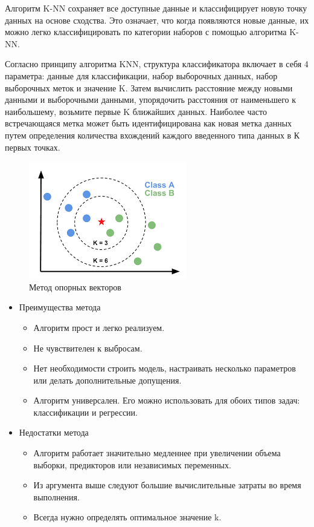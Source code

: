 Алгоритм K-NN сохраняет все доступные данные и классифицирует новую точку данных на основе сходства. Это означает, что когда появляются новые данные, их можно легко классифицировать по категории наборов с помощью алгоритма K-NN.

Согласно принципу алгоритма KNN, структура классификатора включает в себя 4 параметра: данные для классификации, набор выборочных данных, набор выборочных меток и значение K. Затем вычислить расстояние между новыми данными и выборочными данными, упорядочить расстояния от наименьшего к наибольшему, возьмите первые K ближайших данных. Наиболее часто встречающаяся метка может быть идентифицирована как новая метка данных путем определения количества вхождений каждого введенного типа данных в К первых точках.

\captionsetup{justification=centering,singlelinecheck=off}
\begin{figure}[h!]
	\centering
		\includegraphics[pages=-, scale=0.9]{img/knn.png}
		\caption{Метод опорных векторов}  
\end{figure}

\begin{itemize}
\item Преимущества метода
	\begin{itemize}
	\item Алгоритм прост и легко реализуем.
	\item Не чувствителен к выбросам.
	\item Нет необходимости строить модель, настраивать несколько параметров или делать дополнительные допущения.
	\item Алгоритм универсален. Его можно использовать для обоих типов задач: классификации и регрессии.	
	\end{itemize}

\item Недостатки метода
	\begin{itemize}
	\item Алгоритм работает значительно медленнее при увеличении объема выборки, предикторов или независимых переменных.
	\item Из аргумента выше следуют большие вычислительные затраты во время выполнения.
	\item Всегда нужно определять оптимальное значение k.
	\end{itemize}
\end{itemize}


